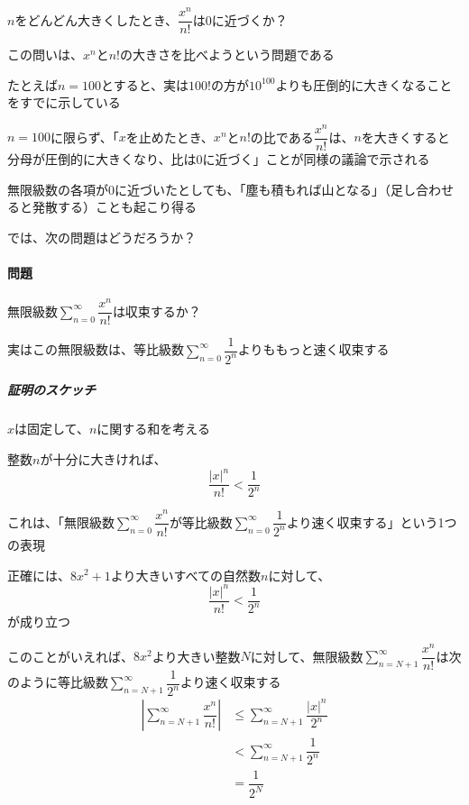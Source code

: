 \documentclass[../book_jiriki_calc]{subfiles}
\begin{document}
$n$をどんどん大きくしたとき、$\dfrac{x^n}{n!}$は$0$に近づくか？

\br

この問いは、$x^n$と$n!$の大きさを比べようという問題である

たとえば$n=100$とすると、実は$100!$の方が$10^{100}$よりも圧倒的に大きくなることをすでに示している

\br

$n=100$に限らず、「$x$を止めたとき、$x^n$と$n!$の比である$\dfrac{x^n}{n!}$は、$n$を大きくすると分母が圧倒的に大きくなり、比は$0$に近づく」ことが同様の議論で示される

\sectionline

無限級数の各項が$0$に近づいたとしても、「塵も積もれば山となる」（足し合わせると発散する）ことも起こり得る

\br

では、次の問題はどうだろうか？

\br

\paragraph{問題}

無限級数$\displaystyle\sum_{n=0}^{\infty} \dfrac{x^n}{n!}$は収束するか？

\br

実はこの無限級数は、等比級数$\displaystyle\sum_{n=0}^{\infty} \dfrac{1}{2^n}$よりももっと速く収束する

\br

\subparagraph{証明のスケッチ}\quad

$x$は固定して、$n$に関する和を考える

\br

整数$n$が十分に大きければ、
\begin{equation}
  \dfrac{\left|x\right|^n}{n!} < \dfrac{1}{2^n}
\end{equation}

これは、「無限級数$\displaystyle\sum_{n=0}^{\infty} \dfrac{x^n}{n!}$が等比級数$\displaystyle\sum_{n=0}^{\infty} \dfrac{1}{2^n}$より速く収束する」という1つの表現

\br

正確には、$8x^2+1$より大きいすべての自然数$n$に対して、
\begin{equation}
  \dfrac{\left|x\right|^n}{n!} < \dfrac{1}{2^n}
\end{equation}
が成り立つ

このことがいえれば、$8x^2$より大きい整数$N$に対して、無限級数$\displaystyle\sum_{n=N+1}^{\infty} \dfrac{x^n}{n!}$は次のように等比級数$\displaystyle\sum_{n=N+1}^{\infty} \dfrac{1}{2^n}$より速く収束する
\begin{align}
  \left| \sum_{n=N+1}^{\infty} \dfrac{x^n}{n!} \right|
   & \leq \sum_{n=N+1}^{\infty} \dfrac{\left| x \right|^n}{2^n} \\
   & < \sum_{n=N+1}^{\infty} \dfrac{1}{2^n}                     \\
   & = \dfrac{1}{2^{N}}
\end{align}
\end{document}
